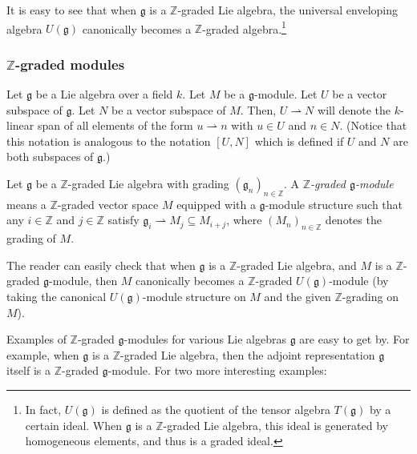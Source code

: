 \documentclass[etingof-lie.tex]{subfiles}
\begin{document}
It is easy to see that when $\mathfrak{g}$ is a $\mathbb{Z}$-graded Lie
algebra, the universal enveloping algebra $U\left(  \mathfrak{g}\right)  $
canonically becomes a $\mathbb{Z}$-graded algebra.\footnote{In fact, $U\left(
\mathfrak{g}\right)  $ is defined as the quotient of the tensor algebra
$T\left(  \mathfrak{g}\right)  $ by a certain ideal. When $\mathfrak{g}$ is a
$\mathbb{Z}$-graded Lie algebra, this ideal is generated by homogeneous
elements, and thus is a graded ideal.}

\subsubsection{\texorpdfstring{$\mathbb{Z}$}{Z}-graded modules}

\begin{definition}
\label{def.liesubspace}Let $\mathfrak{g}$ be a Lie algebra over a field $k$.
Let $M$ be a $\mathfrak{g}$-module. Let $U$ be a vector subspace of
$\mathfrak{g}$. Let $N$ be a vector subspace of $M$. Then, $U\rightharpoonup
N$ will denote the $k$-linear span of all elements of the form
$u\rightharpoonup n$ with $u\in U$ and $n\in N$. (Notice that this notation is
analogous to the notation $\left[  U,N\right]  $ which is defined if $U$ and
$N$ are both subspaces of $\mathfrak{g}$.)
\end{definition}

\begin{definition}
\label{def.gradLie.mod}Let $\mathfrak{g}$ be a $\mathbb{Z}$-graded Lie algebra
with grading $\left(  \mathfrak{g}_{n}\right)  _{n\in\mathbb{Z}}$. A
$\mathbb{Z}$\textit{-graded $\mathfrak{g}$-module} means a $\mathbb{Z}$-graded
vector space $M$ equipped with a $\mathfrak{g}$-module structure such that any
$i\in\mathbb{Z}$ and $j\in\mathbb{Z}$ satisfy $\mathfrak{g}_{i}\rightharpoonup
M_{j}\subseteq M_{i+j}$, where $\left(  M_{n}\right)  _{n\in\mathbb{Z}}$
denotes the grading of $M$.
\end{definition}

The reader can easily check that when $\mathfrak{g}$ is a $\mathbb{Z}$-graded
Lie algebra, and $M$ is a $\mathbb{Z}$-graded $\mathfrak{g}$-module, then $M$
canonically becomes a $\mathbb{Z}$-graded $U\left(  \mathfrak{g}\right)
$-module (by taking the canonical $U\left(  \mathfrak{g}\right)  $-module
structure on $M$ and the given $\mathbb{Z}$-grading on $M$).

Examples of $\mathbb{Z}$-graded $\mathfrak{g}$-modules for various Lie
algebras $\mathfrak{g}$ are easy to get by. For example, when $\mathfrak{g}$
is a $\mathbb{Z}$-graded Lie algebra, then the adjoint representation
$\mathfrak{g}$ itself is a $\mathbb{Z}$-graded $\mathfrak{g}$-module. For two
more interesting examples:
\end{document}
